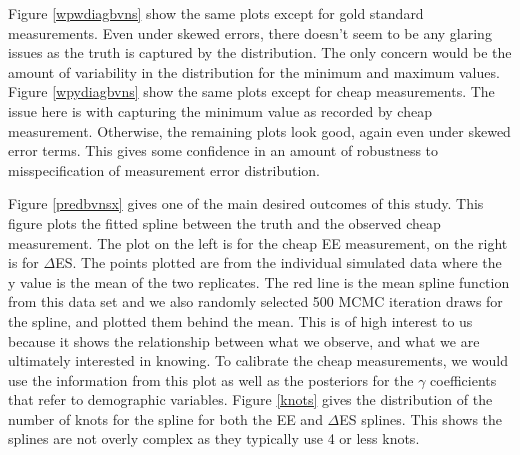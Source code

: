 \documentclass[11pt]{article}\usepackage[]{graphicx}\usepackage[]{color}
\begin{document}
Figure \ref{wpwdiagbvns} show the same plots except for gold standard measurements.  Even under skewed errors, there doesn't seem to be any glaring issues as the truth is captured by the distribution. The only concern would be the amount of variability in the distribution for the minimum and maximum values. Figure \ref{wpydiagbvns} show the same plots except for cheap measurements. The issue here is with capturing the minimum value as recorded by cheap measurement. Otherwise, the remaining plots look good, again even under skewed error terms. This gives some confidence in an amount of robustness to misspecification of measurement error distribution.

Figure \ref{predbvnsx} gives one of the main desired outcomes of this study. This figure plots the fitted spline between the truth and the observed cheap measurement. The plot on the left is for the cheap EE measurement, on the right is for $\Delta$ES. The points plotted are from the individual simulated data where the y value is the mean of the two replicates. The red line is the mean spline function from this data set and we also randomly selected 500 MCMC iteration draws for the spline, and plotted them behind the mean. This is of high interest to us because it shows the relationship between what we observe, and what we are ultimately interested in knowing. To calibrate the cheap measurements, we would use the information from this plot as well as the posteriors for the $\gamma$ coefficients that refer to demographic variables. Figure \ref{knots} gives the distribution of the number of knots for the spline for both the EE and $\Delta$ES splines. This shows the splines are not overly complex as they typically use 4 or less knots.


\end{document}

